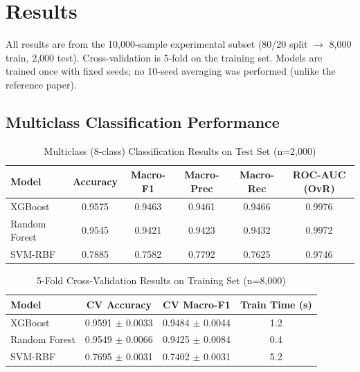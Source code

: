 \section{Results}
\label{sec:results}

All results are from the 10,000-sample experimental subset (80/20 split $\rightarrow$ 8,000 train, 2,000 test). Cross-validation is 5-fold on the training set. Models are trained once with fixed seeds; no 10-seed averaging was performed (unlike the reference paper).

\subsection{Multiclass Classification Performance}

\begin{table}[H]
\centering
\caption{Multiclass (8-class) Classification Results on Test Set (n=2,000)}
\label{tab:multiclass_results}
\begin{tabular}{lccccc}
\toprule
\textbf{Model} & \textbf{Accuracy} & \textbf{Macro-F1} & \textbf{Macro-Prec} & \textbf{Macro-Rec} & \textbf{ROC-AUC (OvR)} \\
\midrule
XGBoost & 0.9575 & 0.9463 & 0.9461 & 0.9466 & 0.9976 \\
Random Forest & 0.9545 & 0.9421 & 0.9423 & 0.9432 & 0.9972 \\
SVM-RBF & 0.7885 & 0.7582 & 0.7792 & 0.7625 & 0.9746 \\
\bottomrule
\end{tabular}
\end{table}

\begin{table}[H]
\centering
\caption{5-Fold Cross-Validation Results on Training Set (n=8,000)}
\label{tab:cv_results}
\begin{tabular}{lccc}
\toprule
\textbf{Model} & \textbf{CV Accuracy} & \textbf{CV Macro-F1} & \textbf{Train Time (s)} \\
\midrule
XGBoost & 0.9591 $\pm$ 0.0033 & 0.9484 $\pm$ 0.0044 & 1.2 \\
Random Forest & 0.9549 $\pm$ 0.0066 & 0.9425 $\pm$ 0.0084 & 0.4 \\
SVM-RBF & 0.7695 $\pm$ 0.0031 & 0.7402 $\pm$ 0.0031 & 5.2 \\
\bottomrule
\end{tabular}
\end{table}

